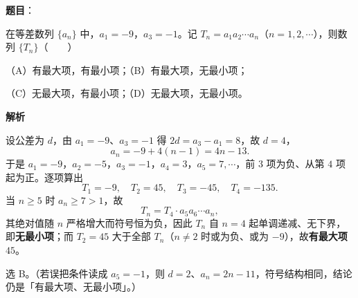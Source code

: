 \begin{answer}

\textbf{题目}：

在等差数列 $\{a_n\}$ 中，$a_1=-9$，$a_3=-1$。记 $T_n=a_1a_2\cdots a_n$（$n=1,2,\cdots$），则数列 $\{T_n\}$\mbox{（　　）}

（A）有最大项，有最小项；（B）有最大项，无最小项；

（C）无最大项，有最小项；（D）无最大项，无最小项。

\textbf{解析}

设公差为 $d$，由 $a_1=-9$、$a_3=-1$ 得 $2d=a_3-a_1=8$，故 $d=4$，
\nopagebreak[4]
\[a_n=-9+4(n-1)=4n-13 .\]
于是 $a_1=-9$，$a_2=-5$，$a_3=-1$，$a_4=3$，$a_5=7,\cdots$，前 $3$ 项为负、从第 $4$ 项起为正。逐项算出
\nopagebreak[4]
\[T_1=-9,\quad T_2=45,\quad T_3=-45,\quad T_4=-135 .\]
当 $n\geqslant5$ 时 $a_n\geqslant7>1$，故
\nopagebreak[4]
\[T_n=T_4\cdot a_5a_6\cdots a_n ,\]
其绝对值随 $n$ 严格增大而符号恒为负，因此 $T_n$ 自 $n=4$ 起单调递减、无下界，即\textbf{无最小项}；而 $T_2=45$ 大于全部 $T_n$（$n\neq2$ 时或为负、或为 $-9$），故\textbf{有最大项} $45$。

选 B。（若误把条件读成 $a_5=-1$，则 $d=2$、$a_n=2n-11$，符号结构相同，结论仍是「有最大项、无最小项」。）


\end{answer}
